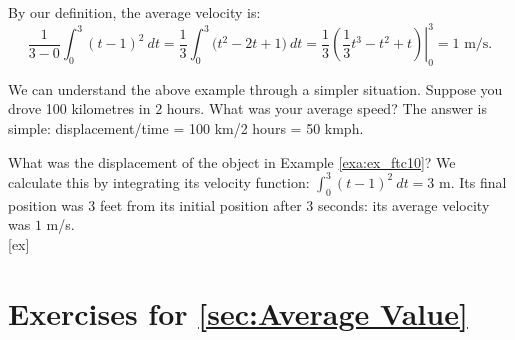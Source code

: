 \begin{solution}
{By our definition, the average velocity is:
	$$\frac{1}{3-0}\int_0^3 (t-1)^2\ dt =\frac13 \int_0^3 \big(t^2-2t+1\big)\ dt = \left.\frac13\left(\frac13t^3-t^2+t\right)\right|_0^3 = 1\text{ m/s}.$$
	}
\end{solution}

We can understand the above example through a simpler situation. Suppose you drove 100 kilometres in $ 2 $ hours. What was your average speed? The answer is simple: displacement/time = 100 km/2 hours = 50 kmph.

What was the displacement of the object in Example \ref{exa:ex_ftc10}? We calculate this by integrating its velocity function: $\int_0^3 (t-1)^2\ dt = 3$ m. Its final position was 3 feet from its initial position after 3 seconds: its average velocity was $ 1 $ m/s.\\



[ex]
\section*{Exercises for \ref{sec:Average Value}}

